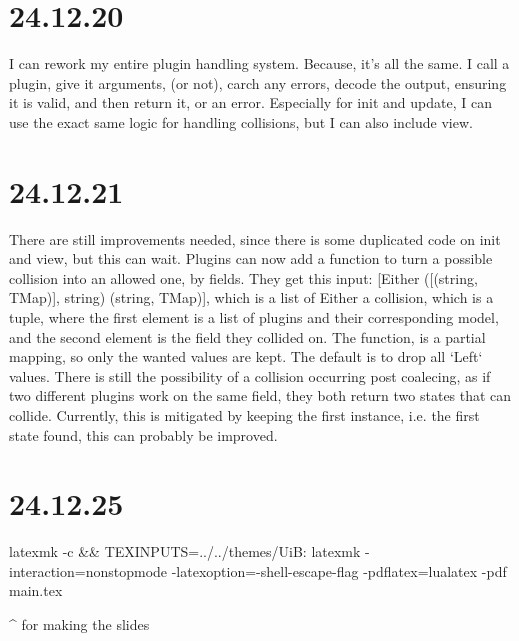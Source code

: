 \section{24.12.20}

I can rework my entire plugin handling system. Because, it's all the same. I
call a plugin, give it arguments, (or not), carch any errors, decode the output,
ensuring it is valid, and then return it, or an error. Especially for init and
update, I can use the exact same logic for handling collisions, but I can also
include view.

\section{24.12.21}

There are still improvements needed, since there is some duplicated code on init
and view, but this can wait. Plugins can now add a function to turn a possible
collision into an allowed one, by fields. They get this input:
[Either ([(string, TMap)], string) (string, TMap)], which is a list of Either
a collision, which is a tuple, where the first element is a list of plugins and
their corresponding model, and the second element is the field they collided on.
The function, is a partial mapping, so only the wanted values are kept. The
default is to drop all `Left` values. There is still the possibility of a
collision occurring post coalecing, as if two different plugins work on the same
field, they both return two states that can collide. Currently, this is
mitigated by keeping the first instance, i.e. the first state found, this can
probably be improved.

\section{24.12.25}

latexmk -c && TEXINPUTS=../../themes/UiB: latexmk -interaction=nonstopmode -latexoption=-shell-escape-flag -pdflatex=lualatex -pdf main.tex

^ for making the slides
